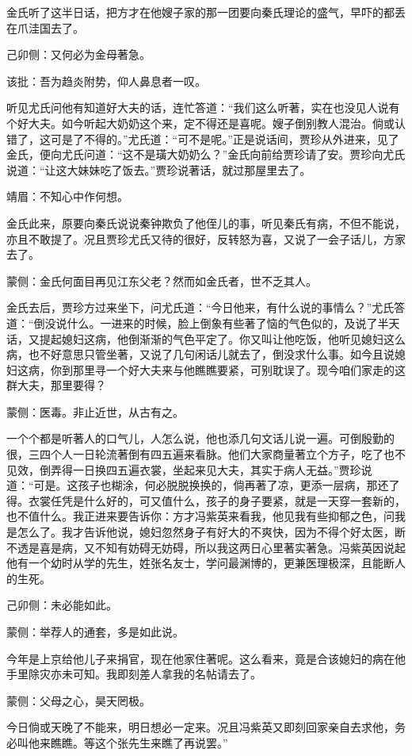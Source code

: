 \begin{parag}
    金氏听了这半日话，把方才在他嫂子家的那一团要向秦氏理论的盛气，早吓的都丢在爪洼国去了。\begin{note}己卯侧：又何必为金母著急。\end{note}\begin{note}该批：吾为趋炎附势，仰人鼻息者一叹。\end{note}听见尤氏问他有知道好大夫的话，连忙答道：“我们这么听著，实在也没见人说有个好大夫。如今听起大奶奶这个来，定不得还是喜呢。嫂子倒别教人混治。倘或认错了，这可是了不得的。”尤氏道：“可不是呢。”正是说话间，贾珍从外进来，见了金氏，便向尤氏问道：“这不是璜大奶奶么？”金氏向前给贾珍请了安。贾珍向尤氏说道：“让这大妹妹吃了饭去。”贾珍说著话，就过那屋里去了。\begin{note}靖眉：不知心中作何想。\end{note}金氏此来，原要向秦氏说说秦钟欺负了他侄儿的事，听见秦氏有病，不但不能说，亦且不敢提了。况且贾珍尤氏又待的很好，反转怒为喜，又说了一会子话儿，方家去了。\begin{note}蒙侧：金氏何面目再见江东父老？然而如金氏者，世不乏其人。\end{note}
\end{parag}


\begin{parag}
    金氏去后，贾珍方过来坐下，问尤氏道：“今日他来，有什么说的事情么？”尤氏答道：“倒没说什么。一进来的时候，脸上倒象有些著了恼的气色似的，及说了半天话，又提起媳妇这病，他倒渐渐的气色平定了。你又叫让他吃饭，他听见媳妇这么病，也不好意思只管坐著，又说了几句闲话儿就去了，倒没求什么事。如今且说媳妇这病，你到那里寻一个好大夫来与他瞧瞧要紧，可别耽误了。现今咱们家走的这群大夫，那里要得？\begin{note}蒙侧：医毒。非止近世，从古有之。\end{note}一个个都是听著人的口气儿，人怎么说，他也添几句文话儿说一遍。可倒殷勤的很，三四个人一日轮流著倒有四五遍来看脉。他们大家商量著立个方子，吃了也不见效，倒弄得一日换四五遍衣裳，坐起来见大夫，其实于病人无益。”贾珍说道：“可是。这孩子也糊涂，何必脱脱换换的，倘再著了凉，更添一层病，那还了得。衣裳任凭是什么好的，可又值什么，孩子的身子要紧，就是一天穿一套新的，也不值什么。我正进来要告诉你：方才冯紫英来看我，他见我有些抑郁之色，问我是怎么了。我才告诉他说，媳妇忽然身子有好大的不爽快，因为不得个好太医，断不透是喜是病，又不知有妨碍无妨碍，所以我这两日心里著实著急。冯紫英因说起他有一个幼时从学的先生，姓张名友士，学问最渊博的，更兼医理极深，且能断人的生死。\begin{note}己卯侧：未必能如此。\end{note}\begin{note}蒙侧：举荐人的通套，多是如此说。\end{note}今年是上京给他儿子来捐官，现在他家住著呢。这么看来，竟是合该媳妇的病在他手里除灾亦未可知。我即刻差人拿我的名帖请去了。\begin{note}蒙侧：父母之心，昊天罔极。\end{note}今日倘或天晚了不能来，明日想必一定来。况且冯紫英又即刻回家亲自去求他，务必叫他来瞧瞧。等这个张先生来瞧了再说罢。”
\end{parag}



